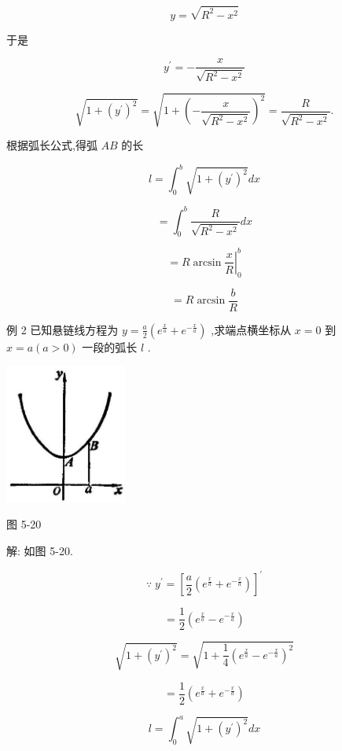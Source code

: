 \documentclass[lang=cn,newtx,10pt,scheme=chinese]{elegantbook}
\begin{document}
\[
y = \sqrt{{R}^{2} - {x}^{2}}
\]

于是

\[
{y}^{\prime } = - \frac{x}{\sqrt{{R}^{2} - {x}^{2}}}
\]

\[
\sqrt{1 + {\left( {y}^{\prime }\right) }^{2}} = \sqrt{1 + {\left( -\frac{x}{\sqrt{{R}^{2} - {x}^{2}}}\right) }^{2}} = \frac{R}{\sqrt{{R}^{2} - {x}^{2}}}.
\]

根据弧长公式,得弧 \({AB}\) 的长

\[
l = {\int }_{0}^{b}\sqrt{1 + {\left( {y}^{\prime }\right) }^{2}}{dx}
\]

\[
= {\int }_{0}^{b}\frac{R}{\sqrt{{R}^{2} - {x}^{2}}}{dx}
\]

\[
= {\left. R\arcsin \frac{x}{R}\right| }_{0}^{b}
\]

\[
= R\arcsin \frac{b}{R}
\]

例 2 已知悬链线方程为 \(y = \frac{a}{2}\left( {{e}^{\frac{x}{a}} + {e}^{-\frac{x}{a}}}\right)\) ,求端点横坐标从 \(x = 0\) 到 \(x = a\left( {a > 0}\right)\) 一段的弧长 \(l\) .

\begin{center}
\includegraphics[max width=0.3\textwidth]{images/01912c18-5c3f-733d-b775-749ba9897a9d_243_219487.jpg}
\end{center}

图 5-20

解: 如图 5-20.

\[
\because \;{y}^{\prime } = {\left\lbrack \frac{a}{2}\left( {e}^{\frac{x}{a}} + {e}^{-\frac{x}{a}}\right) \right\rbrack }^{\prime }
\]

\[
= \frac{1}{2}\left( {{e}^{\frac{x}{a}} - {e}^{-\frac{x}{a}}}\right)
\]

\[
\sqrt{1 + {\left( {y}^{\prime }\right) }^{2}} = \sqrt{1 + \frac{1}{4}{\left( {e}^{\frac{x}{a}} - {e}^{-\frac{x}{a}}\right) }^{2}}
\]

\[
= \frac{1}{2}\left( {{e}^{\frac{x}{a}} + {e}^{-\frac{x}{a}}}\right)
\]

\[
l = {\int }_{0}^{a}\sqrt{1 + {\left( {y}^{\prime }\right) }^{2}}{dx}
\]
\end{document}
